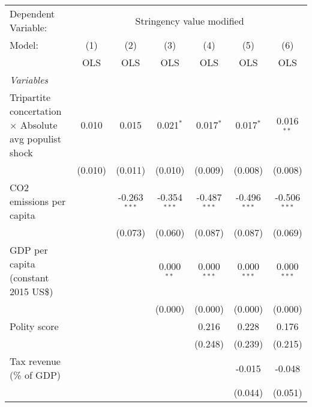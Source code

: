 
\begingroup
\centering
\begin{tabular}{lcccccc}
   \toprule
   Dependent Variable: & \multicolumn{6}{c}{Stringency value modified}\\
   Model:                                                        & (1)     & (2)            & (3)            & (4)            & (5)            & (6)\\  
                                                                 &  OLS    & OLS            & OLS            & OLS            & OLS            & OLS\\  
   \midrule
   \emph{Variables}\\
   Tripartite concertation $\times$ Absolute avg populist shock  & 0.010   & 0.015          & 0.021$^{*}$    & 0.017$^{*}$    & 0.017$^{*}$    & 0.016$^{**}$\\   
                                                                 & (0.010) & (0.011)        & (0.010)        & (0.009)        & (0.008)        & (0.008)\\   
   CO2 emissions per capita                                      &         & -0.263$^{***}$ & -0.354$^{***}$ & -0.487$^{***}$ & -0.496$^{***}$ & -0.506$^{***}$\\   
                                                                 &         & (0.073)        & (0.060)        & (0.087)        & (0.087)        & (0.069)\\   
   GDP per capita (constant 2015 US\$)                           &         &                & 0.000$^{**}$   & 0.000$^{***}$  & 0.000$^{***}$  & 0.000$^{***}$\\   
                                                                 &         &                & (0.000)        & (0.000)        & (0.000)        & (0.000)\\   
   Polity score                                                  &         &                &                & 0.216          & 0.228          & 0.176\\   
                                                                 &         &                &                & (0.248)        & (0.239)        & (0.215)\\   
   Tax revenue (\% of GDP)                                       &         &                &                &                & -0.015         & -0.048\\   
                                                                 &         &                &                &                & (0.044)        & (0.051)\\   

\end{tabular}
